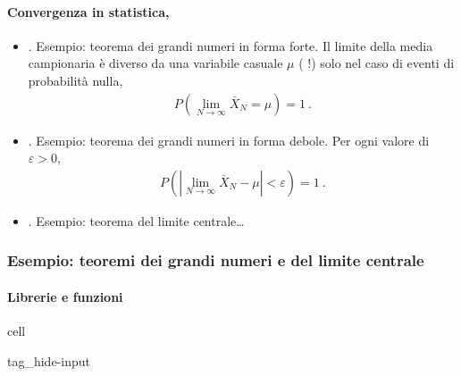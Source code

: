 \documentclass[letterpaper,10pt,italian]{jupyterBook}
\begin{document}
\paragraph{Convergenza in statistica, }
\label{\detokenize{ch/statistics/iid:convergenza-in-statistica-todo}}\begin{itemize}
\item {} 
\sphinxAtStartPar
{}. Esempio: teorema dei grandi numeri in forma forte. Il limite della media campionaria è diverso da una variabile casuale \(\mu\) ( !) solo nel caso di eventi di probabilità nulla,
\begin{equation*}
\begin{split}P\left( \lim_{N \rightarrow \infty} \bar{X}_N = \mu \right) = 1 \ .\end{split}
\end{equation*}
\item {} 
\sphinxAtStartPar
{}. Esempio: teorema dei grandi numeri in forma debole. Per ogni valore di \(\varepsilon > 0\),
\begin{equation*}
\begin{split}P\left( \left|\lim_{N \rightarrow \infty} \bar{X}_N - \mu \right| < \varepsilon \right) = 1 \ .\end{split}
\end{equation*}
\item {} 
\sphinxAtStartPar
{}. Esempio: teorema del limite centrale…

\end{itemize}


\subsubsection{Esempio: teoremi dei grandi numeri e del limite centrale}
\label{\detokenize{ch/statistics/iid:esempio-teoremi-dei-grandi-numeri-e-del-limite-centrale}}

\paragraph{Librerie e funzioni}
\label{\detokenize{ch/statistics/iid:librerie-e-funzioni}}
\begin{sphinxuseclass}{cell}
\begin{sphinxuseclass}{tag_hide-input}
\end{sphinxuseclass}
\end{sphinxuseclass}
\end{document}
